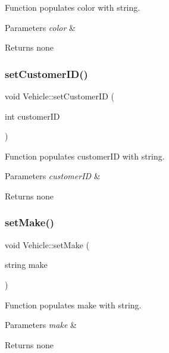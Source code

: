 Function populates color with string. 
\begin{DoxyParams}{Parameters}
{\em color} & \\
\hline
\end{DoxyParams}
\begin{DoxyReturn}{Returns}
none 
\end{DoxyReturn}
\mbox{\label{class_vehicle_ab15f9d0d115fa64ec5b3a6c40caca2ff}} 
\subsubsection{\texorpdfstring{set\+Customer\+I\+D()}{setCustomerID()}}
{\footnotesize\ttfamily void Vehicle\+::set\+Customer\+ID (\begin{DoxyParamCaption}\item[{int}]{customer\+ID }\end{DoxyParamCaption})}

Function populates customer\+ID with string. 
\begin{DoxyParams}{Parameters}
{\em customer\+ID} & \\
\hline
\end{DoxyParams}
\begin{DoxyReturn}{Returns}
none 
\end{DoxyReturn}
\mbox{\label{class_vehicle_a889588751f2751b4c76740407a769ca2}} 
\subsubsection{\texorpdfstring{set\+Make()}{setMake()}}
{\footnotesize\ttfamily void Vehicle\+::set\+Make (\begin{DoxyParamCaption}\item[{string}]{make }\end{DoxyParamCaption})}

Function populates make with string. 
\begin{DoxyParams}{Parameters}
{\em make} & \\
\hline
\end{DoxyParams}
\begin{DoxyReturn}{Returns}
none 
\end{DoxyReturn}
\mbox{\label{class_vehicle_a3a813eb34cc39eb0790e3b04d2d975e3}} 
